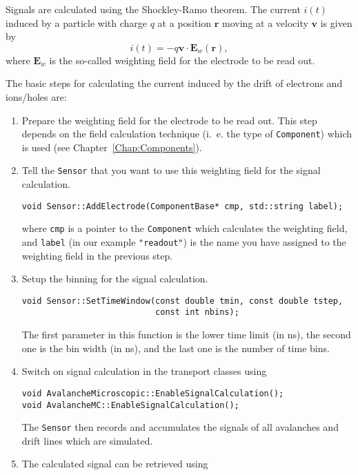 Signals are calculated using the Shockley-Ramo theorem. 
The current \(i\left(t\right)\) induced by a particle with charge 
\(q\) at a position \(\mathbf{r}\) moving at a velocity \(\mathbf{v}\)
is given by
\begin{equation*}
  i\left(t\right) = -q \mathbf{v} \cdot \mathbf{E}_{w}\left(\mathbf{r}\right),
\end{equation*}
where \(\mathbf{E}_{w}\) is the so-called weighting field for the 
electrode to be read out. 

The basic steps for calculating the current induced 
by the drift of electrons and ions/holes are:
\begin{enumerate}
  \item
  Prepare the weighting field for the electrode to be read out. 
  This step depends on the field calculation technique 
  (i.~e. the type of \texttt{Component}) which is used 
  (see Chapter~\ref{Chap:Components}). 
  \item
  Tell the \texttt{Sensor} that you want to use this 
  weighting field for the signal calculation. 
  \begin{lstlisting}
void Sensor::AddElectrode(ComponentBase* cmp, std::string label);
  \end{lstlisting}
  where \texttt{cmp} is a pointer to the \texttt{Component} 
  which calculates the weighting field, and \texttt{label} 
  (in our example \texttt{"readout"}) is 
  the name you have assigned to the weighting field in the previous step.
  \item
  Setup the binning for the signal calculation.
  \begin{lstlisting}
void Sensor::SetTimeWindow(const double tmin, const double tstep, 
                           const int nbins);
  \end{lstlisting}
  The first parameter in this function is the lower time limit (in ns), 
  the second one is the bin width (in ns), and the last one 
  is the number of time bins.
  \item
  Switch on signal calculation in the transport classes using 
  \begin{lstlisting}
void AvalancheMicroscopic::EnableSignalCalculation();
void AvalancheMC::EnableSignalCalculation();
  \end{lstlisting}
  The \texttt{Sensor} then records and accumulates the signals of all 
  avalanches and drift lines which are simulated.
  \item
  The calculated signal can be retrieved using 
  \begin{lstlisting}

\end{lstlisting}
\end{enumerate}
